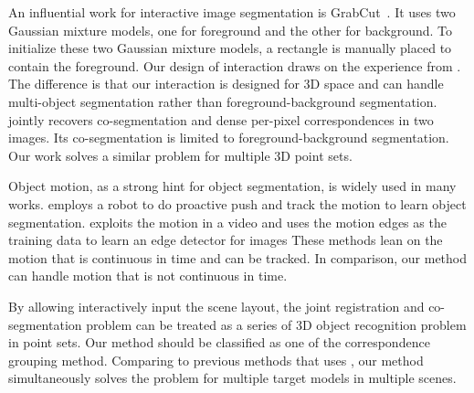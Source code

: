 %
An influential work for interactive image segmentation is GrabCut~\cite{grabcut}. 
It uses two Gaussian mixture models, one for foreground and the other for background. 
To initialize these two Gaussian mixture models, a rectangle is manually placed to contain the foreground. 
Our design of interaction draws on the experience from \cite{grabcut}. 
%
The difference is that our interaction is designed for 3D space and can handle multi-object segmentation rather than foreground-background segmentation. 
%
\cite{Taniai_2016_CVPR} jointly recovers co-segmentation and dense per-pixel correspondences in two images. 
Its co-segmentation is limited to foreground-background segmentation. Our work solves a similar problem for multiple 3D point sets. 

Object motion, as a strong hint for object segmentation, is widely used in many works.
\cite{Xu:2015:ACS:2816795.2818075} employs a robot to do proactive push and track the motion to learn object segmentation. 
\cite{unsupervisededge} exploits the motion in a video and uses the motion edges as the training data to learn an edge detector for images
These methods lean on the motion that is continuous in time and can be tracked. 
In comparison, our method can handle motion that is not continuous in time.

By allowing interactively input the scene layout, the joint registration and co-segmentation problem can be treated as a series of 3D object recognition problem in point sets. 
%
Our method should be classified as one of the correspondence grouping method. 
Comparing to previous methods that uses \cite{hough,LOF}, our method simultaneously solves the problem for multiple target models in multiple scenes.
